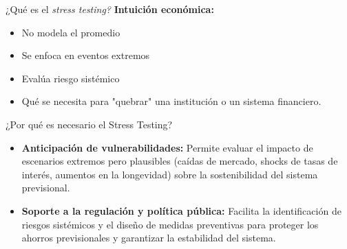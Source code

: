 \documentclass{beamer}
\begin{document}
\begin{frame}[t]{¿Qué es el \textit{stress testing?}}
\textbf{Intuición económica:}
\begin{itemize}
\item No modela el promedio
\item Se enfoca en eventos extremos
\item Evalúa riesgo sistémico
\item Qu\'e se necesita para "quebrar" una instituci\'on o un sistema financiero.
\end{itemize}
\end{frame}
\begin{frame}{¿Por qué es necesario el Stress Testing?}

\begin{itemize}

\item \textbf{Anticipación de vulnerabilidades:}  
Permite evaluar el impacto de escenarios extremos pero plausibles (caídas de mercado, shocks de tasas de interés, aumentos en la longevidad) sobre la sostenibilidad del sistema previsional.

\vspace{0.5cm}

\item \textbf{Soporte a la regulación y política pública:}  
Facilita la identificación de riesgos sistémicos y el diseño de medidas preventivas para proteger los ahorros previsionales y garantizar la estabilidad del sistema.

\end{itemize}

\end{frame}
\end{document}
